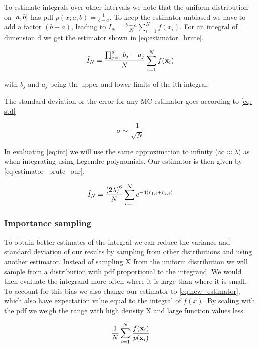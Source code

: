 To estimate integrals over other intervals we note that the uniform
distribution on $\left[a,b\right]$ has pdf $p(x;a,b) = \frac{1}{b-a}$.
To keep the estimator unbiased we have to add a factor $(b-a)$, leading to
$\hat{I}_N = \frac{b-a}{N}\sum_{i=1}^{N}f(x_i)$.
For an integral of dimension d we get the estimator shown in
\cref{eq:estimator_brute}.

\begin{equation}
  \label{eq:estimator_brute}
  \hat{I}_N
  = \frac{\prod_{j=1}^{d} b_j - a_j }{N}\sum_{i=1}^{N} f(\mathbf{x}_i)
\end{equation}

with $b_j$ and $a_j$ being the upper and lower limits of the ith integral.

The standard deviation or the error for any MC estimator goes according to \cref{eq: std}

\begin{equation}\label{eq: std}
  \sigma \sim \frac{1}{\sqrt{N}}
\end{equation}


In evaluating \cref{eq:int} we will use the same approximation to infinity
($\infty \approx \lambda$) as when integrating using Legendre polynomials. Our
estimator is then given by \cref{eq:estimator_brute_our}.

\begin{equation}
  \label{eq:estimator_brute_our}
  \hat{I}_N
  = \frac{\left(2\lambda\right)^6}{N} \sum_{i=1}^{N} e^{-4(r_{1,i} + r_{2,i})}
\end{equation}



\subsubsection{Importance sampling}

To obtain better estimates of the integral we can reduce the variance and
standard deviation of our results by sampling from other distributions and using
another estimator. Instead of sampling X from the uniform distribution we will
sample from a distribution with pdf proportional to the integrand. We would then
evaluate the integrand more often where it is large than where it is small. To
account for this bias we also change our estimator to \cref{eq:new_estimator},
which also have expectation value equal to the integral of $f(x)$.
By scaling with the pdf we weigh the range with high density X and large
function values less.

\begin{equation}
  \label{eq:new_estimator}
  \frac{1}{N} \sum_{i=1}^{N} \frac{f(\mathbf{x}_i)}{p(\mathbf{x}_i)}
\end{equation}


